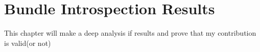 \chapter{Bundle Introspection Results}

This chapter will make a deep analysis if results and prove that my contribution is valid(or not)